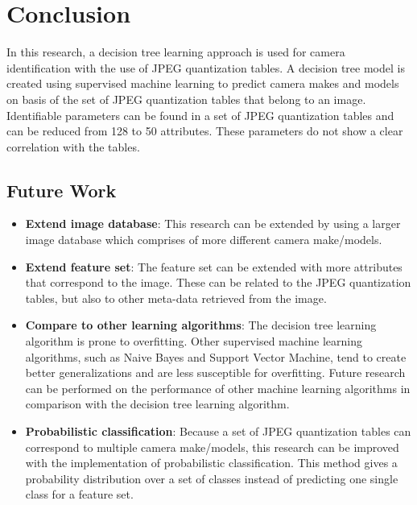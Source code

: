 \chapter{Conclusion} %
\label{ch:cncl} %


In this research, a decision tree learning approach is used for camera identification with the use of JPEG quantization tables.  A decision tree model is created using supervised machine learning to predict camera makes and models on basis of the set of JPEG quantization tables that belong to an image. 
Identifiable parameters can be found in a set of JPEG quantization tables and can be reduced from 128 to 50 attributes. These parameters do not show a clear correlation with the tables. 


\section{Future Work}\label{sec:fut}
\begin{itemize}
\item \textbf{Extend image database}: This research can be extended by using a larger image database which comprises of more different camera make/models.
\item \textbf{Extend feature set}: The feature set can be extended with more attributes that correspond to the image. These can be related to the JPEG quantization tables, but also to other meta-data retrieved from the image.
\item \textbf{Compare to other learning algorithms}: The decision tree learning algorithm is prone to overfitting. Other supervised machine learning algorithms, such as Naive Bayes and Support Vector Machine, tend to create better generalizations and are less susceptible for overfitting. Future research can be performed on the performance of other machine learning algorithms in comparison with the decision tree learning algorithm.
\item \textbf{Probabilistic classification}: Because a set of JPEG quantization tables can correspond to multiple camera make/models, this research can be improved with the implementation of probabilistic classification. This method gives a probability distribution over a set of classes instead of predicting one single class for a feature set.

\end{itemize}
\iffalse
